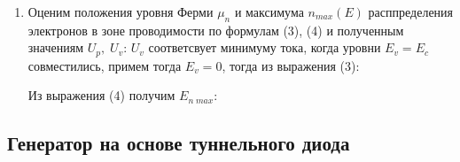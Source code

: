 \documentclass[a4paper]{article}
\begin{document}
\begin{enumerate}
    \item Оценим положения уровня Ферми $\mu_n$ и максимума $n_{max}(E)$ расппределения электронов в зоне проводимости по формулам (3), (4) и 
    полученным значениям $U_p,\; U_v$:
    $U_v$ соответсвует минимуму тока, когда уровни $E_v=E_c$ совместились, примем тогда $E_v=0$, тогда из выражения (3):
    \begin{center}
    \end{center}
    Из выражения (4) получим $E_{n\; max}$:
    \begin{center}
    \end{center}
\end{enumerate}


\subsection{Генератор на основе туннельного диода}
\end{document}
